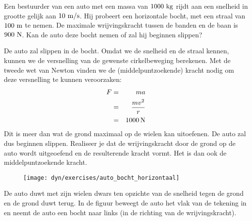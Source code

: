 \documentclass{ximera}
\begin{document}
\begin{exercise} Een bestuurder van een auto met een massa van $1000~\rm kg$ rijdt aan een snelheid in grootte gelijk aan $10~\rm m/s$. Hij probeert een horizontale bocht, met een straal van $100~\rm m$ te nemen. De maximale wrijvingskracht tussen de banden en de baan is $900~\rm N$. Kan de auto deze bocht nemen of zal hij beginnen slippen?
\begin{oplossing}
\newline
\newline
De auto zal slippen in de bocht. Omdat we de snelheid en de straal kennen, kunnen we de versnelling van de gewenste cirkelbeweging berekenen. Met de tweede wet van Newton vinden we de (middelpuntzoekende) kracht nodig om deze versnelling te kunnen veroorzaken:
\begin{eqnarray*}
F&=&ma\\
&=&\frac{mv^2}{r}\\
&=&1000\rm\,N
\end{eqnarray*}
Dit is meer dan wat de grond maximaal op de wielen kan uitoefenen. De auto zal dus beginnen slippen.
\newline
\newline
Realiseer je dat de wrijvingskracht door de grond op de auto wordt uitgeoefend en de resulterende kracht vormt. Het is dan ook de middelpuntzoekende kracht. 
\begin{figure}[h]
\centering\texttt{[image: dyn/exercises/auto\_bocht\_horizontaal]}
\end{figure}
De auto duwt met zijn wielen dwars ten opzichte van de snelheid tegen de grond en de grond duwt terug. In de figuur beweegt de auto het vlak van de tekening in en neemt de auto een bocht naar links (in de richting van de wrijvingskracht).
\end{oplossing}



\end{exercise}
\end{document}

